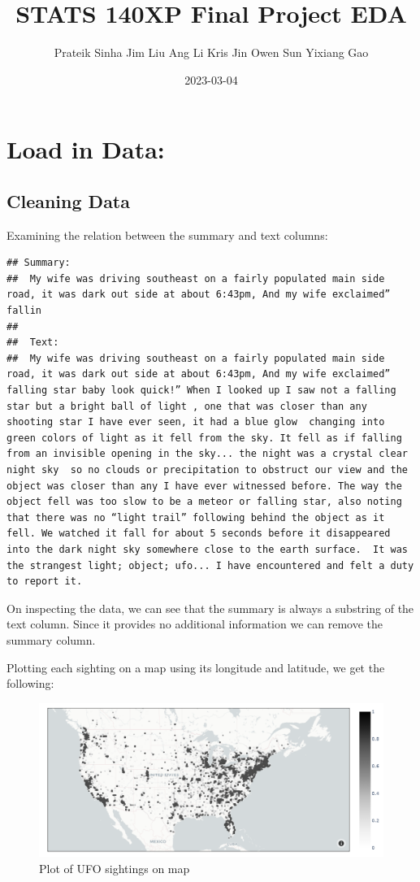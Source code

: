 \documentclass[
]{article}
\title{STATS 140XP Final Project EDA}
\author{Prateik Sinha \textbar{} Jim Liu \textbar{} Ang Li \textbar{}
Kris Jin \textbar{} Owen Sun \textbar{} Yixiang Gao}
\date{2023-03-04}
\begin{document}
\maketitle

\hypertarget{load-in-data}{%
\section{Load in Data:}\label{load-in-data}}

\hypertarget{cleaning-data}{%
\subsection{Cleaning Data}\label{cleaning-data}}

Examining the relation between the summary and text columns:

\begin{verbatim}
## Summary:
##  My wife was driving southeast on a fairly populated main side road, it was dark out side at about 6:43pm, And my wife exclaimed” fallin 
## 
##  Text:
##  My wife was driving southeast on a fairly populated main side road, it was dark out side at about 6:43pm, And my wife exclaimed” falling star baby look quick!” When I looked up I saw not a falling star but a bright ball of light , one that was closer than any shooting star I have ever seen, it had a blue glow  changing into green colors of light as it fell from the sky. It fell as if falling from an invisible opening in the sky... the night was a crystal clear night sky  so no clouds or precipitation to obstruct our view and the object was closer than any I have ever witnessed before. The way the object fell was too slow to be a meteor or falling star, also noting that there was no “light trail” following behind the object as it fell. We watched it fall for about 5 seconds before it disappeared into the dark night sky somewhere close to the earth surface.  It was the strangest light; object; ufo... I have encountered and felt a duty to report it.
\end{verbatim}

On inspecting the data, we can see that the summary is always a
substring of the text column. Since it provides no additional
information we can remove the summary column.

Plotting each sighting on a map using its longitude and latitude, we get
the following:

\begin{figure}
\centering
\includegraphics{ufo_map.png}
\caption{Plot of UFO sightings on map}
\end{figure}
\end{document}

